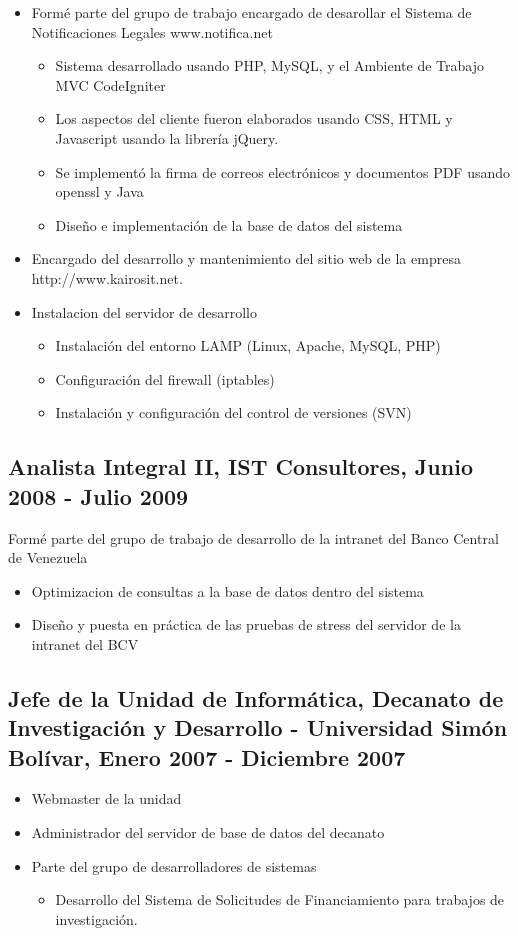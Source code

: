 \documentclass[letterpaper,11pt]{report}
\begin{document}
\begin{itemize}
\item
  Formé parte del grupo de trabajo encargado de desarollar el Sistema de Notificaciones Legales www.notifica.net
  \begin{itemize}
  \item Sistema desarrollado usando PHP, MySQL, y el Ambiente de Trabajo MVC CodeIgniter
  \item Los aspectos del cliente fueron elaborados usando CSS, HTML y Javascript usando la librería jQuery.
  \item Se implementó la firma de correos electrónicos y documentos PDF usando openssl y Java
  \item Dise\~{n}o e implementación de la base de datos del sistema
  \end{itemize}
\item
  Encargado del desarrollo y mantenimiento del sitio web de la empresa http://www.kairosit.net.
\item Instalacion del servidor de desarrollo
  \begin{itemize}
  \item Instalación del entorno LAMP (Linux, Apache, MySQL, PHP)
  \item Configuración del firewall (iptables)
  \item Instalación y configuración del control de versiones (SVN)
  \end{itemize}
\end{itemize}

\subsection*{Analista Integral II, IST Consultores, Junio 2008 - Julio 2009}
Formé parte del grupo de trabajo de desarrollo de la intranet del Banco Central de Venezuela
	\begin{itemize}
	\item Optimizacion de consultas a la base de datos dentro del sistema
	\item Dise\~{n}o y puesta en práctica de las pruebas de stress del servidor de la intranet del BCV
	\end{itemize}

\subsection*{Jefe de la Unidad de Informática, Decanato de Investigación y Desarrollo - Universidad Simón Bolívar, Enero 2007 - Diciembre 2007}
\begin{itemize}
\item Webmaster de la unidad
\item Administrador del servidor de base de datos del decanato
\item Parte del grupo de desarrolladores de sistemas
\begin{itemize}
	\item Desarrollo del Sistema de Solicitudes de Financiamiento para trabajos de investigación.
\end{itemize}
\end{itemize}
\end{document}
